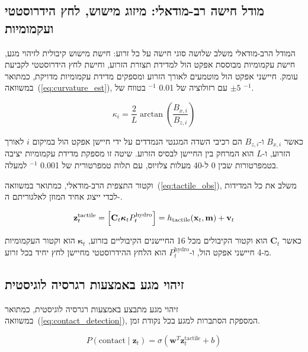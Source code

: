 \subsection{מודל חישה רב-מודאלי: מיזוג מישוש, לחץ הידרוסטטי ועקמומיות}
\label{sec:sensors_multimodal}

המודל הרב-מודאלי משלב שלושה סוגי חישה על כל זרוע: חישת מישוש קיבולית לזיהוי מגע, חישת עקמומיות מבוססת אפקט הול למדידת תצורת הזרוע, וחישת לחץ הידרוסטטי לקביעת עומק. חיישני אפקט הול מוטמעים לאורך הזרוע ומספקים מדידת עקמומיות מדויקת, כמתואר במשוואה~(\ref{eq:curvature_est}), עם רזולוציה של 0.01 $^{-1}$ בטווח של $\pm 5$ $^{-1}$.

\begin{equation}
\kappa_i = \frac{2}{L} \arctan\left(\frac{B_{x,i}}{B_{z,i}}\right)
\label{eq:curvature_est}
\end{equation}

כאשר $B_{x,i}$ ו-$B_{z,i}$ הם רכיבי השדה המגנטי הנמדדים על ידי חיישן אפקט הול במיקום $i$ לאורך הזרוע, ו-$L$ הוא המרחק בין החיישן לבסיס הזרוע. שיטה זו מספקת מדידת עקמומיות יציבה בטמפרטורות שבין 0 ל-40 מעלות צלזיוס, עם תלות טמפרטורית של 0.001 $^{-1}$ למעלה.

וקטור התצפית הרב-מודאלי, כמתואר במשוואה~(\ref{eq:tactile_obs}), משלב את כל המדידות לכדי ייצוג אחיד המוזן לאלגוריתם ה-.

\begin{equation}
\mathbf{z}_t^{\text{tactile}} = \left[\mathbf{C}_t \\ \boldsymbol{\kappa}_t \\ P_t^{\text{hydro}}\right] = h_{\text{tactile}}(\mathbf{x}_t, \mathbf{m}) + \mathbf{v}_t
\label{eq:tactile_obs}
\end{equation}

כאשר $\mathbf{C}_t$ הוא וקטור הקיבולים מכל 16 החיישנים הקיבוליים בזרוע, $\boldsymbol{\kappa}_t$ הוא וקטור העקמומיות מ-4 חיישני אפקט הול, ו-$P_t^{\text{hydro}}$ הוא הלחץ ההידרוסטטי מחיישן לחץ יחיד בכל זרוע.

\subsection{זיהוי מגע באמצעות רגרסיה לוגיסטית}
\label{sec:sensors_contact}

זיהוי מגע מתבצע באמצעות רגרסיה לוגיסטית, כמתואר במשוואה~(\ref{eq:contact_detection}), המספקת הסתברות למגע בכל נקודת זמן.

\begin{equation}
P(\text{contact} \mid \mathbf{z}_t) = \sigma\left( \mathbf{w}^T \mathbf{z}_t^{\text{tactile}} + b \right)
\label{eq:contact_detection}
\end{equation}

